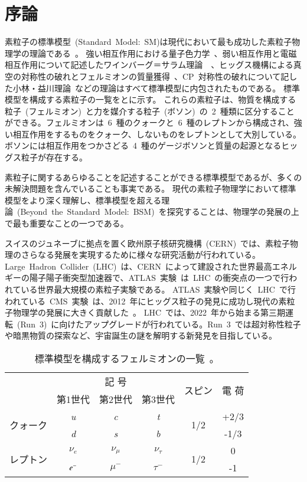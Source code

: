 \chapter{序論}
\thispagestyle{empty}
\label{chap:1}
素粒子の標準模型~(Standard~Model:~SM)は現代において最も成功した素粒子物理学の理論である~\cite{URL:10}。
強い相互作用における量子色力学~\cite{AR:04}、弱い相互作用と電磁相互作用について記述したワインバーグ＝サラム理論~\cite{AR:05}~\cite{AR:05a}、ヒッグス機構による真空の対称性の破れとフェルミオンの質量獲得~\cite{AR:06}、CP~対称性の破れについて記した小林・益川理論~\cite{AR:07}などの理論はすべて標準模型に内包されたものである。
標準模型を構成する素粒子の一覧をとに示す。
これらの素粒子は、物質を構成する粒子~(フェルミオン)~と力を媒介する粒子~(ボソン)~の~2~種類に区分することができる。フェルミオンは~6~種のクォークと~6~種のレプトンから構成され、強い相互作用をするものをクォーク、しないものをレプトンとして大別している。ボソンには相互作用をつかさどる~4~種のゲージボソンと質量の起源となるヒッグス粒子が存在する。

素粒子に関するあらゆることを記述することができる標準模型であるが、多くの未解決問題を含んでいることも事実である。
現代の素粒子物理学において標準模型をより深く理解し、標準模型を超える理論~(Beyond~the~Standard~Model:~BSM)~を探究することは、物理学の発展の上で最も重要なことの一つである。

スイスのジュネーブに拠点を置く欧州原子核研究機構~(CERN)~\cite{URL:11}では、素粒子物理のさらなる発展を実現するために様々な研究活動が行われている。Large~Hadron~Collider~(LHC)~\cite{URL:12}は、CERN~によって建設された世界最高エネルギーの陽子陽子衝突型加速器で、ATLAS~実験~\cite{URL:13}は~LHC~の衝突点の一つで行われている世界最大規模の素粒子実験である。
ATLAS~実験や同じく~LHC~で行われている~CMS~実験~\cite{URL:14}は、2012~年にヒッグス粒子の発見に成功し現代の素粒子物理学の発展に大きく貢献した~\cite{TR:03,TR:03a}。
LHC~では、2022~年から始まる第三期運転~(Run~3)~に向けたアップグレードが行われている。Run~3~では超対称性粒子や暗黒物質の探索など、宇宙誕生の謎を解明する新発見を目指している。

\begin{table}[htbp]
	\centering
	\begin{tabular}{c|ccc|c|c} \hline
	& \multicolumn{3}{c|}{記 号} & \multirow{2}{*}{スピン} & \multirow{2}{*}{電  荷} \\
	& 第1世代 & 第2世代 & 第3世代 &&  \\ \hline\hline
	\multirow{2}{*}{クォーク} & \it{u} & \it{c} & \it{t} & \multirow{2}{*}{1/2} & +2/3 \\
	& \it{d} & \it{s} & \it{b} &  & -1/3 \\ \hline
	\multirow{2}{*}{レプトン} & $\nu_{e}$ & $\nu_{\mu}$ & $\nu_{\tau}$ & \multirow{2}{*}{1/2} & 0 \\
	& $\it{e}^-$ & $\mu^-$ & $\tau^-$ &  & -1 \\ \hline
	\end{tabular}
	\caption[標準模型を構成するフェルミオンの一覧]{標準模型を構成するフェルミオンの一覧~\cite{URL:10}。}
	\label{tb:SM1}
\end{table}

